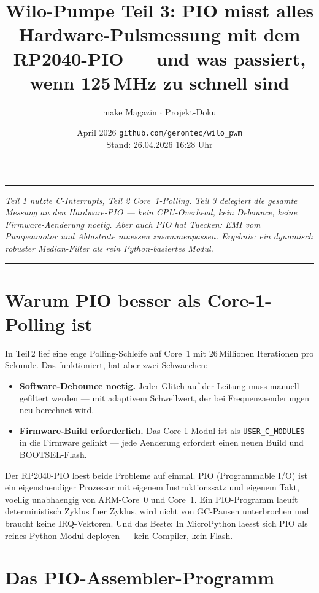\documentclass[11pt,a4paper]{article}
\title{\textbf{Wilo-Pumpe Teil 3: PIO misst alles}\\[4pt]
  \large Hardware-Pulsmessung mit dem RP2040-PIO ---
  und was passiert, wenn 125\,MHz zu schnell sind}
\author{make Magazin $\cdot$ Projekt-Doku}
\date{April 2026 \quad \texttt{github.com/gerontec/wilo\_pwm}\\[2pt]
  \small Stand: 26.04.2026 16:28 Uhr}
\begin{document}
\maketitle
\thispagestyle{empty}

\noindent\rule{\textwidth}{0.4pt}
\begin{center}
\textit{Teil 1 nutzte C-Interrupts, Teil 2 Core~1-Polling.
Teil 3 delegiert die gesamte Messung an den Hardware-PIO ---
kein CPU-Overhead, kein Debounce, keine Firmware-Aenderung noetig.
Aber auch PIO hat Tuecken: EMI vom Pumpenmotor und Abtastrate
muessen zusammenpassen. Ergebnis: ein dynamisch robuster Median-Filter
als rein Python-basiertes Modul.}
\end{center}
\noindent\rule{\textwidth}{0.4pt}

\bigskip

\section{Warum PIO besser als Core-1-Polling ist}

In Teil\,2 lief eine enge Polling-Schleife auf Core~1 mit
26\,Millionen Iterationen pro Sekunde.
Das funktioniert, hat aber zwei Schwaechen:

\begin{itemize}
\item \textbf{Software-Debounce noetig.}
  Jeder Glitch auf der Leitung muss manuell gefiltert werden ---
  mit adaptivem Schwellwert, der bei Frequenzaenderungen neu berechnet wird.
\item \textbf{Firmware-Build erforderlich.}
  Das Core-1-Modul ist als \texttt{USER\_C\_MODULES} in die Firmware gelinkt ---
  jede Aenderung erfordert einen neuen Build und BOOTSEL-Flash.
\end{itemize}

Der RP2040-PIO loest beide Probleme auf einmal.
PIO (Programmable I/O) ist ein eigenstaendiger Prozessor mit
eigenem Instruktionssatz und eigenem Takt, voellig unabhaengig
von ARM-Core~0 und Core~1.
Ein PIO-Programm laeuft deterministisch Zyklus fuer Zyklus,
wird nicht von GC-Pausen unterbrochen und braucht keine IRQ-Vektoren.
Und das Beste: In MicroPython laesst sich PIO als reines Python-Modul
deployen --- kein Compiler, kein Flash.

\section{Das PIO-Assembler-Programm}
\end{document}
